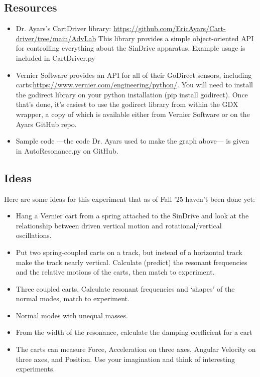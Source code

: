\documentclass[11 pt]{article}
\begin{document}
\subsection*{Resources}
\begin{itemize}
	\item Dr. Ayars's CartDriver library: \url{https://github.com/EricAyars/Cart-driver/tree/main/AdvLab}
		This library provides a simple object-oriented API for controlling everything about the SinDrive apparatus.
		Example usage is included in CartDriver.py
	\item Vernier Software provides an API for all of their GoDirect sensors, including carts:\url{https://www.vernier.com/engineering/python/}. You will need to install the godirect library on your python installation (pip install godirect). 
		Once that's done, it's easiest to use the godirect library from within the GDX wrapper, a copy of which is available either from Vernier Software or on the Ayars GitHub repo.
	\item Sample code ---the code Dr. Ayars used to make the graph above--- is given in AutoResonance.py on GitHub.
\end{itemize}

\subsection*{Ideas}
Here are some ideas for this experiment that as of Fall '25 haven't been done yet:
\begin{itemize}
	\item Hang a Vernier cart from a spring attached to the SinDrive and look at the relationship between driven vertical motion and rotational/vertical oscillations.
	\item Put two spring-coupled carts on a track, but instead of a horizontal track make the track nearly vertical. 
		Calculate (predict) the resonant frequencies and the relative motions of the carts, then match to experiment.
	\item Three coupled carts. 
		Calculate resonant frequencies and `shapes' of the normal modes, match to experiment.
	\item Normal modes with unequal masses.
	\item From the width of the resonance, calculate the damping coefficient for a cart
	\item The carts can measure Force, Acceleration on three axes, Angular Velocity on three axes, and Position. Use your imagination and think of interesting experiments.
\end{itemize}
\end{document}
